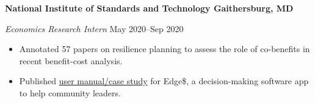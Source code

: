 \textbf{National Institute of Standards and Technology \hfill Gaithersburg, MD}\par

\textit{Economics Research Intern} \hfill May 2020--Sep 2020
\begin{itemize}
	\item Annotated 57 papers on resilience planning to assess the role of co-benefits in recent benefit-cost analysis.
	\item Published \href{https://nvlpubs.nist.gov/nistpubs/SpecialPublications/NIST.SP.1260.pdf}{user manual/case study} for Edge\$, a decision-making software app to help community leaders.
\end{itemize}\par